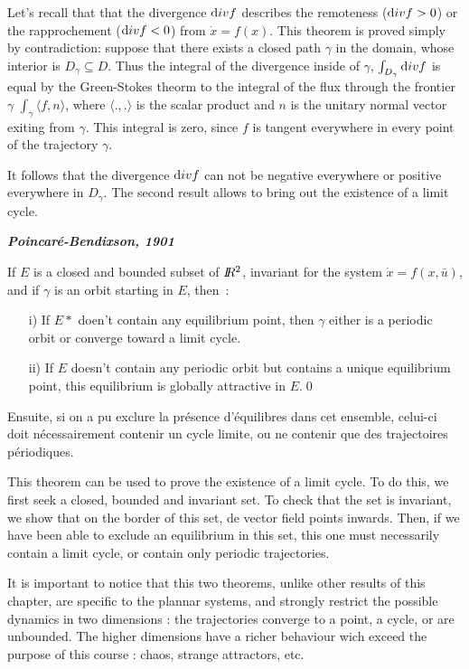 Let's recall that that the divergence ${\mbox div}f$ describes the remoteness (${\mbox div}f >0$) or the rapprochement (${\mbox div}f <0$) from $\dot{x}=f(x)$.
This theorem is proved simply by contradiction: suppose that there exists a closed path $\gamma$ in the domain, whose interior is $D_{\gamma} \subseteq D$.
Thus the integral of the divergence inside of $\gamma$, $\int_{D_\gamma}  {\mbox div}f$ is equal by the Green-Stokes theorm to the integral
of the flux through the frontier $\gamma$ $\int_\gamma \langle f, n \rangle$, where $\langle.,.\rangle$
is the scalar product and $n$ is the unitary normal vector exiting from $\gamma$.
This integral is zero, since $f$ is tangent everywhere in every point of the trajectory $\gamma$. 

It follows that the divergence ${\mbox div}f$ can not be negative everywhere or positive everywhere in $D_{\gamma}$.
The second result allows to bring out the existence of a limit cycle.

\begin{theoreme} {\bf \em Poincar{é}-Bendixson, 1901}

If $E$ is a closed and bounded subset of $I \! \! R^2$, invariant for the system $\dot x= f(x,\bar u)$, and if $\gamma$ is an orbit
starting in $E$, then~:

\begin{itemize}
\item[i)] If $E*$ doen't contain any equilibrium point, then $\gamma$ either is a periodic orbit or converge toward a limit cycle.

\item[ii)] If $E$ doesn't contain any periodic orbit but contains a unique equilibrium point, this equilibrium is globally attractive in $E$.\qed
\end{itemize}
\end{theoreme}

Ensuite, si on a pu exclure la
pr{é}sence d'{é}quilibres dans cet ensemble, celui-ci doit n{é}cessairement contenir un
cycle limite, ou ne contenir que des trajectoires p{é}riodiques.

This theorem can be used to prove the existence of a limit cycle. To do this, we first seek a closed, bounded and invariant set.
To check that the set is invariant, we show that on the border of this set, de vector field points inwards. Then, if we have been 
able to exclude an equilibrium in this set, this one must necessarily contain a limit cycle, or contain only periodic trajectories.

It is important to notice that this two theorems, unlike other results of this chapter, are specific to the plannar systems, 
and strongly restrict the possible dynamics in two dimensions : the trajectories converge to a point, a cycle, or are unbounded.
The higher dimensions have a richer behaviour wich exceed the purpose of this course : chaos, strange attractors, etc.

